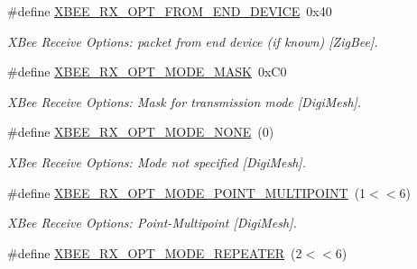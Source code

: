 \begin{DoxyCompactItemize}
\#define \hyperlink{group__xbee__device_gaed8a550b168aa09686266454a2da2a2d}{X\+B\+E\+E\+\_\+\+R\+X\+\_\+\+O\+P\+T\+\_\+\+F\+R\+O\+M\+\_\+\+E\+N\+D\+\_\+\+D\+E\+V\+I\+CE}~0x40
\begin{DoxyCompactList}\small\item\em X\+Bee Receive Options\+: packet from end device (if known) \mbox{[}Zig\+Bee\mbox{]}. \end{DoxyCompactList}\item 
\mbox{\label{group__xbee__device_ga79f154b39bb259ad7898783eebd1242c}} 
\#define \hyperlink{group__xbee__device_ga79f154b39bb259ad7898783eebd1242c}{X\+B\+E\+E\+\_\+\+R\+X\+\_\+\+O\+P\+T\+\_\+\+M\+O\+D\+E\+\_\+\+M\+A\+SK}~0x\+C0
\begin{DoxyCompactList}\small\item\em X\+Bee Receive Options\+: Mask for transmission mode \mbox{[}Digi\+Mesh\mbox{]}. \end{DoxyCompactList}\item 
\mbox{\label{group__xbee__device_gaad601da5df374a25c456fbc3df93a253}} 
\#define \hyperlink{group__xbee__device_gaad601da5df374a25c456fbc3df93a253}{X\+B\+E\+E\+\_\+\+R\+X\+\_\+\+O\+P\+T\+\_\+\+M\+O\+D\+E\+\_\+\+N\+O\+NE}~(0)
\begin{DoxyCompactList}\small\item\em X\+Bee Receive Options\+: Mode not specified \mbox{[}Digi\+Mesh\mbox{]}. \end{DoxyCompactList}\item 
\mbox{\label{group__xbee__device_ga6465ba8e665a2614ee4479608c2ac3fc}} 
\#define \hyperlink{group__xbee__device_ga6465ba8e665a2614ee4479608c2ac3fc}{X\+B\+E\+E\+\_\+\+R\+X\+\_\+\+O\+P\+T\+\_\+\+M\+O\+D\+E\+\_\+\+P\+O\+I\+N\+T\+\_\+\+M\+U\+L\+T\+I\+P\+O\+I\+NT}~(1$<$$<$6)
\begin{DoxyCompactList}\small\item\em X\+Bee Receive Options\+: Point-\/\+Multipoint \mbox{[}Digi\+Mesh\mbox{]}. \end{DoxyCompactList}\item 
\mbox{\label{group__xbee__device_ga93f4b2a84bb3d00a3bfaa1b2c3497c2e}} 
\#define \hyperlink{group__xbee__device_ga93f4b2a84bb3d00a3bfaa1b2c3497c2e}{X\+B\+E\+E\+\_\+\+R\+X\+\_\+\+O\+P\+T\+\_\+\+M\+O\+D\+E\+\_\+\+R\+E\+P\+E\+A\+T\+ER}~(2$<$$<$6)

\end{DoxyCompactItemize}
